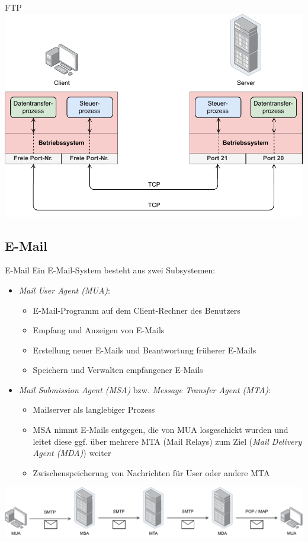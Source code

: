 \begin{example}{FTP}
    \centering
    \includegraphics[width=.7\textwidth]{includes/figures/example_ftp.pdf}
\end{example}

\subsection{E-Mail}

\begin{defi}{E-Mail}
    Ein E-Mail-System besteht aus zwei Subsystemen:
    \begin{itemize}
        \item \emph{Mail User Agent (MUA)}:
              \begin{itemize}
                  \item E-Mail-Programm auf dem Client-Rechner des Benutzers
                  \item Empfang und Anzeigen von E-Mails
                  \item Erstellung neuer E-Mails und Beantwortung früherer E-Mails
                  \item Speichern und Verwalten empfangener E-Mails
              \end{itemize}
        \item \emph{Mail Submission Agent (MSA)} bzw. \emph{Message Transfer Agent (MTA)}:
              \begin{itemize}
                  \item Mailserver als langlebiger Prozess
                  \item MSA nimmt E-Mails entgegen, die von MUA losgeschickt wurden und leitet diese ggf. über mehrere MTA (Mail Relays) zum Ziel (\emph{Mail Delivery Agent (MDA)}) weiter
                  \item Zwischenspeicherung von Nachrichten für User oder andere MTA
              \end{itemize}
    \end{itemize}

    \centering
    \includegraphics[width=\textwidth]{includes/figures/defi_mail.pdf}
\end{defi}

